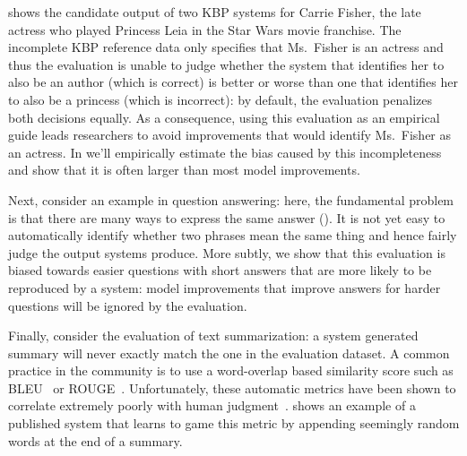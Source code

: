  shows the candidate output of two KBP systems for Carrie Fisher, the late actress who played Princess Leia in the Star Wars movie franchise.
The incomplete KBP reference data only specifies that Ms.\ Fisher is an actress and thus the evaluation is unable to judge whether the system that identifies her to also be an author (which is correct) is better or worse than one that identifies her to also be a princess (which is incorrect): by default, the evaluation penalizes both decisions equally.
As a consequence, using this evaluation as an empirical guide leads researchers to avoid improvements that would identify Ms.\ Fisher as an actress.
In  we'll empirically estimate the bias caused by this incompleteness and show that it is often larger than most model improvements.

Next, consider an example in question answering:
  here, the fundamental problem is that there are many ways to express the same answer ().
It is not yet easy to automatically identify whether two phrases mean the same thing and hence fairly judge the output systems produce.
More subtly, we show that this evaluation is biased towards easier questions with short answers that are more likely to be reproduced by a system:
  model improvements that improve answers for harder questions will be ignored by the evaluation.

Finally, consider the evaluation of text summarization: a system generated summary will never exactly match the one in the evaluation dataset.
A common practice in the community is to use a word-overlap based similarity score such as BLEU~\citep{papineni02bleu} or ROUGE~\citep{lin2004rouge}\@.
Unfortunately, these automatic metrics have been shown to correlate extremely poorly with human judgment~\citep{novikova2017why}.
 shows an example of a published system that learns to game this metric by appending seemingly random words at the end of a summary.

